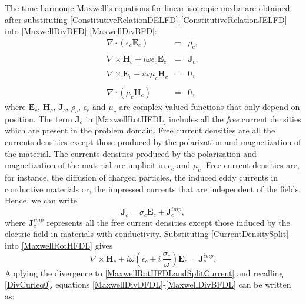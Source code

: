The time-harmonic Maxwell's equations for linear isotropic media are obtained after substituting \eqref{ConstitutiveRelationDELFD}-\eqref{ConstitutiveRelationJELFD} into \eqref{MaxwellDivDFD}-\eqref{MaxwellDivBFD}:
\begin{eqnarray}
    \nabla\cdot\left(\epsilon_{c}\mathbf{E}_{c}\right) &=& \rho_{c}, \label{MaxwellDivDFDL}
	\\\nonumber
	\\[-1em]
	\nabla\times\mathbf{H}_{c} + i\omega\epsilon_{c}\mathbf{E}_{c} &=& \mathbf{J}_{c}, \label{MaxwellRotHFDL}
	\\\nonumber
	\\[-1em]
	\nabla\times\mathbf{E}_{c} - i\omega\mu_{c}\mathbf{H}_{c} &=& 0, \label{MaxwellRotEFDL}
	\\\nonumber
	\\[-1em]
	\nabla\cdot\left(\mu_{c}\mathbf{H}_{c}\right) &=& 0, \label{MaxwellDivBFDL}
\end{eqnarray}
where $\mathbf{E}_{c}$, $\mathbf{H}_{c}$, $\mathbf{J}_{c}$, $\rho_{c}$, $\epsilon_{c}$ and $\mu_{c}$ are complex valued functions that only depend on position. The term $\mathbf{J}_{c}$ in \eqref{MaxwellRotHFDL} includes all the \emph{free} current densities which are present in the problem domain. Free current densities are all the currents densities except those produced by the polarization and magnetization of the material. The currents densities produced by the polarization and magnetization of the material are implicit in $\epsilon_{c}$ and $\mu_{c}$. Free current densities are, for instance, the diffusion of charged particles, the induced eddy currents in conductive materials or, the impressed currents that are independent of the fields. Hence, we can write
\begin{equation}\label{CurrentDensitySplit}
    \mathbf{J}_{c} = \sigma_{c}\mathbf{E}_{c} + \mathbf{J}_{c}^{imp},
\end{equation}
where $\mathbf{J}_{c}^{imp}$ represents all the free current densities except those induced by the electric field in materials with conductivity. Substituting \eqref{CurrentDensitySplit} into \eqref{MaxwellRotHFDL} gives
\begin{equation}\label{MaxwellRotHFDLandSplitCurrent}
    \nabla\times\mathbf{H}_{c} + i\omega\left(\epsilon_{c} + i\, \frac{\sigma_{c}}{\omega}\right)\mathbf{E}_{c} = \mathbf{J}_{c}^{imp}.
\end{equation}
Applying the divergence to \eqref{MaxwellRotHFDLandSplitCurrent} and recalling \eqref{DivCurleq0}, equations \eqref{MaxwellDivDFDL}-\eqref{MaxwellDivBFDL} can be written as:
